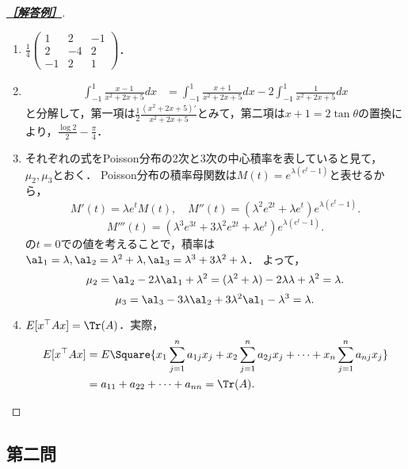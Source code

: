 \documentclass[uplatex,dvipdfmx]{jsarticle}
\begin{document}
\begin{proof}[\textbf{\underline{［解答例］}}]\mbox{}
    \begin{enumerate}
        \item $\frac{1}{4}\begin{pmatrix}1&2&-1\\2&-4&2\\-1&2&1\end{pmatrix}$．
        \item \begin{align*}
            \int^1_{-1}\frac{x-1}{x^2+2x+5}dx&=\int^1_{-1}\frac{x+1}{x^2+2x+5}dx-2\int^1_{-1}\frac{1}{x^2+2x+5}dx
        \end{align*}
        と分解して，第一項は$\frac{1}{2}\frac{(x^2+2x+5)'}{x^2+2x+5}$とみて，第二項は$x+1=2\tan\theta$の置換により，$\frac{\log 2}{2}-\frac{\pi}{4}$．
        \item それぞれの式をPoisson分布の2次と3次の中心積率を表していると見て，$\mu_2,\mu_3$とおく．
        Poisson分布の積率母関数は$M(t)=e^{\lambda(e^t-1)}$と表せるから，
        \[M'(t)=\lambda e^{t}M(t),\quad M''(t)=(\lambda^2 e^{2t}+\lambda e^t)e^{\lambda(e^t-1)}.\]
        \[M'''(t)=(\lambda^3e^{3t}+3\lambda^2e^{2t}+\lambda e^t)e^{\lambda(e^t-1)}.\]
        の$t=0$での値を考えることで，積率は$\al_1=\lambda,\al_2=\lambda^2+\lambda,\al_3=\lambda^3+3\lambda^2+\lambda$．
        よって，
        \[\mu_2=\al_2-2\lambda\al_1+\lambda^2=(\lambda^2+\lambda)-2\lambda\lambda+\lambda^2=\lambda.\]
        \[\mu_3=\al_3-3\lambda\al_2+3\lambda^2\al_1-\lambda^3=\lambda.\]
        \item $E[x^\top Ax]=\Tr(A)$．実際，
        \begin{align*}
            E[x^\top Ax]&=E\Square{x_1\sum_{j=1}^na_{1j}x_j+x_2\sum_{j=1}^na_{2j}x_j+\cdots+x_n\sum_{j=1}^na_{nj}x_j}\\
            &=a_{11}+a_{22}+\cdots+a_{nn}=\Tr(A).
        \end{align*}
    \end{enumerate}
\end{proof}

\subsection{第二問}
\end{document}
